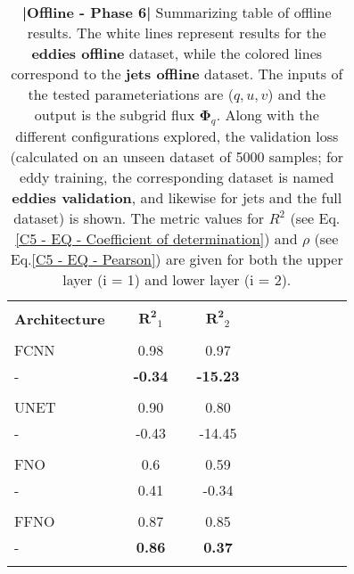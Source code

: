 \bgroup
\def\arraystretch{1.5}
\begin{table}[H]
\vspace{-0.5cm}
\hspace{-1.2cm}
\begin{tabular}{llclclclclcl}
\Xhline{1.5pt}\\[-1.5em]
\textbf{Architecture}  &  & $\boldsymbol{R^2}_1$ &  & $\boldsymbol{R^2}_2$ \\[0.4em] 
\cline{1-1} \cline{3-3} \cline{5-5} \\[-1.4em]
FCNN        &  & 0.98           &  & 0.97        \\ \rowcolor{Gray}
-     		&  & \textbf{-0.34}     &  & \textbf{-15.23}       \\ [0.4em]
\hline \\[-1.4em]
UNET        &  & 0.90      &  & 0.80        \\ \rowcolor{Gray}
-     		&  & -0.43     &  & -14.45       \\  
\hline \\[-1.4em]
FNO         &  & 0.6       &  & 0.59        \\ \rowcolor{Gray}
-     		&  & 0.41      &  & -0.34        \\  
\hline \\[-1.4em]
FFNO        &  & 0.87           &  & 0.85        \\ \rowcolor{Gray}
-     		&  & \textbf{0.86}    &  & \textbf{0.37}        \\ 
\Xhline{1.5pt}\\[-0.8em]      
\end{tabular}
\caption{\textbf{|}\textcolor{section_color}{\textbf{Offline - Phase 6}}\textbf{|} Summarizing table of offline results. The white lines represent results for the \textbf{eddies offline} dataset, while the colored lines correspond to the \textbf{jets offline} dataset. The inputs of the tested parameteriations are ($q, u, v$) and the output is the subgrid flux $\mathbf{\Phi}_q$. Along with the different configurations explored, the validation loss (calculated on an unseen dataset of 5000 samples; for eddy training, the corresponding dataset is named \textbf{eddies validation}, and likewise for jets and the full dataset) is shown. The metric values for $R^2$ (see Eq.\ref{C5 - EQ - Coefficient of determination}) and $\rho$ (see Eq.\ref{C5 - EQ - Pearson}) are given for both the upper layer (i = 1) and lower layer (i = 2).}
\label{C5 - TAB - PHASE 6}
\end{table}
\bgroup
